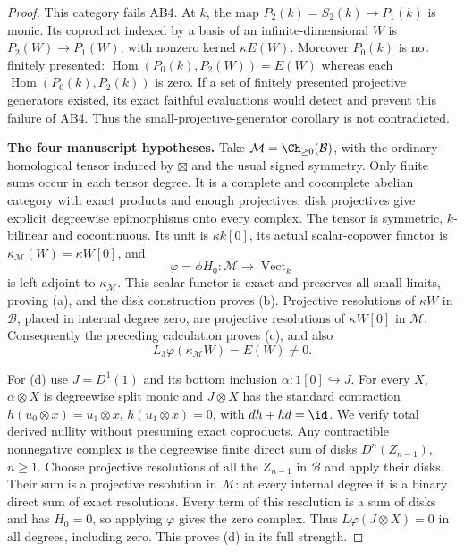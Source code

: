 \begin{proof}
This category fails AB4. At $k$, the map $P_2(k)=S_2(k)\to P_1(k)$ is monic. Its coproduct indexed by a basis of an infinite-dimensional $W$ is $P_2(W)\to P_1(W)$, with nonzero kernel $\kappa E(W)$. Moreover $P_0(k)$ is not finitely presented: $\operatorname{Hom}(P_0(k),P_2(W))=E(W)$ whereas each $\operatorname{Hom}(P_0(k),P_2(k))$ is zero. If a set of finitely presented projective generators existed, its exact faithful evaluations would detect and prevent this failure of AB4. Thus the small-projective-generator corollary is not contradicted.


\textbf{The four manuscript hypotheses.}
Take $\mathcal M=\Ch_{\geq0}(\mathcal B)$, with the ordinary homological tensor induced by $\boxtimes$ and the usual signed symmetry. Only finite sums occur in each tensor degree. It is a complete and cocomplete abelian category with exact products and enough projectives; disk projectives give explicit degreewise epimorphisms onto every complex. The tensor is symmetric, $k$-bilinear and cocontinuous. Its unit is $\kappa k[0]$, its actual scalar-copower functor is $\kappa_{\mathcal M}(W)=\kappa W[0]$, and
\[
\varphi=\phi H_0:\mathcal M\longrightarrow\operatorname{Vect}_k
\]
is left adjoint to $\kappa_{\mathcal M}$. This scalar functor is exact and preserves all small limits, proving (a), and the disk construction proves (b). Projective resolutions of $\kappa W$ in $\mathcal B$, placed in internal degree zero, are projective resolutions of $\kappa W[0]$ in $\mathcal M$. Consequently the preceding calculation proves (c), and also
\[
L_3\varphi(\kappa_{\mathcal M}W)=E(W)\ne0.
\]

For (d) use $J=D^1(1)$ and its bottom inclusion $\alpha:1[0]\hookrightarrow J$. For every $X$, $\alpha\otimes X$ is degreewise split monic and $J\otimes X$ has the standard contraction $h(u_0\otimes x)=u_1\otimes x$, $h(u_1\otimes x)=0$, with $dh+hd=\id$. We verify total derived nullity without presuming exact coproducts. Any contractible nonnegative complex is the degreewise finite direct sum of disks $D^n(Z_{n-1})$, $n\geq1$. Choose projective resolutions of all the $Z_{n-1}$ in $\mathcal B$ and apply their disks. Their sum is a projective resolution in $\mathcal M$: at every internal degree it is a binary direct sum of exact resolutions. Every term of this resolution is a sum of disks and has $H_0=0$, so applying $\varphi$ gives the zero complex. Thus $L\varphi(J\otimes X)=0$ in all degrees, including zero. This proves (d) in its full strength.


\end{proof}
